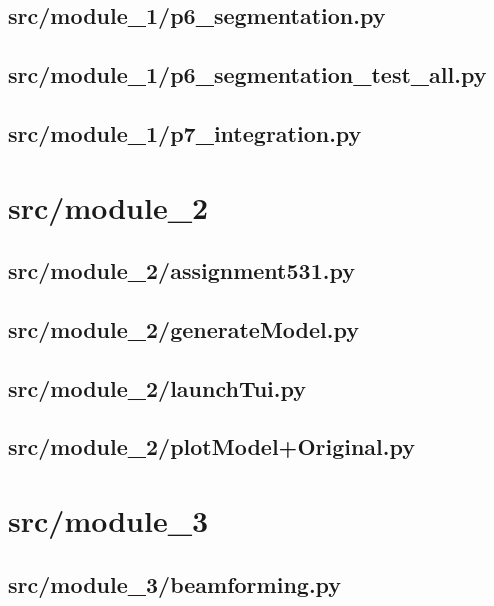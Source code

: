 \subsection*{src/module\_1/p6\_segmentation.py}
\label{ap:p6_segmentation}
\subsection*{src/module\_1/p6\_segmentation\_test\_all.py}
\label{ap:p6_segmentation_test_all}
\subsection*{src/module\_1/p7\_integration.py}
\label{ap:p7_integration}
\section{src/module\_2}
\subsection*{src/module\_2/assignment531.py}
\label{ap:assignment531}
\subsection*{src/module\_2/generateModel.py}
\label{ap:generateModel}
\subsection*{src/module\_2/launchTui.py}
\label{ap:launchTui}
\subsection*{src/module\_2/plotModel+Original.py}
\label{ap:plotModel+Original}
\section{src/module\_3}
\subsection*{src/module\_3/beamforming.py}
\label{ap:beamforming}

